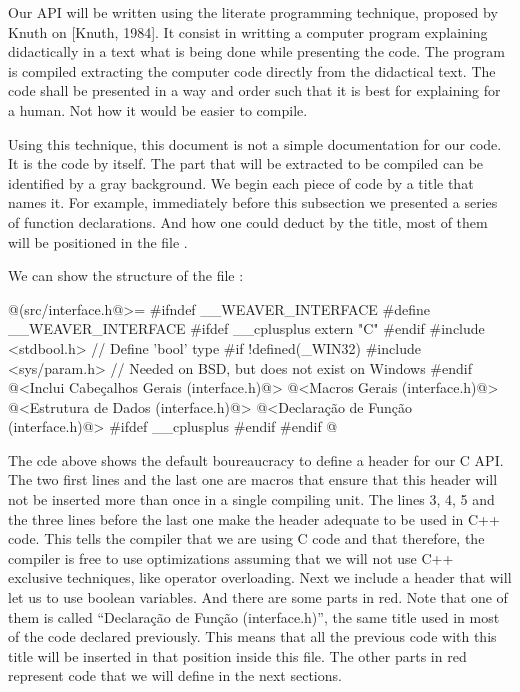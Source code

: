 
Our API will be written using the literate programming technique,
proposed by Knuth on [Knuth, 1984]. It consist in writting a computer
program explaining didactically in a text what is being done while
presenting the code. The program is compiled extracting the computer
code directly from the didactical text. The code shall be presented in
a way and order such that it is best for explaining for a human. Not
how it would be easier to compile.

Using this technique, this document is not a simple documentation for
our code. It is the code by itself. The part that will be extracted to
be compiled can be identified by a gray background. We begin each
piece of code by a title that names it. For example, immediately
before this subsection we presented a series of function
declarations. And how one could deduct by the title, most of them will
be positioned in the file .

We can show the structure of the file :

\iniciocodigo
@(src/interface.h@>=
#ifndef __WEAVER_INTERFACE
#define __WEAVER_INTERFACE
#ifdef __cplusplus
extern "C" {
#endif
#include <stdbool.h> // Define  'bool' type
#if !defined(_WIN32)
#include <sys/param.h> // Needed on BSD, but does not exist on Windows
#endif  
@<Inclui Cabeçalhos Gerais (interface.h)@>
@<Macros Gerais (interface.h)@>
@<Estrutura de Dados (interface.h)@>
@<Declaração de Função (interface.h)@>
#ifdef __cplusplus
}
#endif
#endif
@
\fimcodigo

The cde above shows the default boureaucracy to define a header for
our C API. The two first lines and the last one are macros that ensure
that this header will not be inserted more than once in a single
compiling unit. The lines 3, 4, 5 and the three lines before the last
one make the header adequate to be used in C++ code. This tells the
compiler that we are using C code and that therefore, the compiler is
free to use optimizations assuming that we will not use C++ exclusive
techniques, like operator overloading. Next we include a header that
will let us to use boolean variables. And there are some parts in
red. Note that one of them is called ``Declaração de Função
(interface.h)'', the same title used in most of the code declared
previously. This means that all the previous code with this title will
be inserted in that position inside this file. The other parts in red
represent code that we will define in the next sections.

